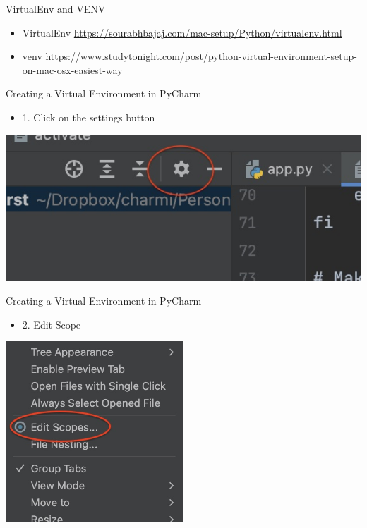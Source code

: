\documentclass{beamer}
\begin{document}
\begin{frame}
{\centerline{VirtualEnv and VENV}}
\begin{itemize}
    \item VirtualEnv \url{https://sourabhbajaj.com/mac-setup/Python/virtualenv.html}
    \item venv \url{https://www.studytonight.com/post/python-virtual-environment-setup-on-mac-osx-easiest-way}
\end{itemize} 

\end{frame}



\begin{frame}
{\centerline{Creating a Virtual Environment in PyCharm}}
\begin{itemize}
    \item 1. Click on the settings button
\end{itemize} 
\begin{center}
    \includegraphics[width=\textwidth]{Coding/PyCharm.Settings.jpg}
\end{center}
\end{frame}

\begin{frame}
{\centerline{Creating a Virtual Environment in PyCharm}}
\begin{itemize}
    \item 2. Edit Scope
\end{itemize} 
\begin{center}
    \includegraphics[width=0.5\textwidth]{Coding/PyCharm.EditScope.jpg}
\end{center}
\end{frame}
\end{document}
